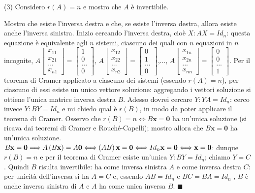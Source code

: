 \documentclass{article}
\begin{document}
(3) Considero $r\left( A\right) =n$ e mostro che $A$ \`{e} invertibile.

Mostro che esiste l'inversa destra e che, se esiste l'inversa destra, allora
esiste anche l'inversa sinistra. Inizio cercando l'inversa destra, cio\`{e} $%
X:AX=Id_{n}$: questa equazione \`{e} equivalente agli $n$ sistemi, ciascuno
dei quali con $n$ equazioni in $n$ incognite, $A\left[ 
\begin{array}{c}
x_{11} \\ 
x_{21} \\ 
... \\ 
x_{n1}%
\end{array}%
\right] =\left[ 
\begin{array}{c}
1 \\ 
0 \\ 
... \\ 
0%
\end{array}%
\right] $, $A\left[ 
\begin{array}{c}
x_{12} \\ 
x_{22} \\ 
... \\ 
x_{n2}%
\end{array}%
\right] =\left[ 
\begin{array}{c}
0 \\ 
1 \\ 
... \\ 
0%
\end{array}%
\right] $,..., $A\left[ 
\begin{array}{c}
x_{1n} \\ 
x_{2n} \\ 
... \\ 
x_{nn}%
\end{array}%
\right] =\left[ 
\begin{array}{c}
0 \\ 
0 \\ 
... \\ 
1%
\end{array}%
\right] $. Per il teorema di Cramer applicato a ciascuno dei sistemi
(essendo $r\left( A\right) =n$), per ciascuno di essi esiste un unico
vettore soluzione: aggregando i vettori soluzione si ottiene l'unica matrice
inversa destra $B$. Adesso dovrei cercare $Y:YA=Id_{n}$: cerco invece $%
Y:BY=Id_{n}$ e mi chiedo qual \`{e} $r\left( B\right) $, in modo da poter
applicare il teorema di Cramer. Osservo
che $r\left( B\right) =n\Longleftrightarrow B\mathbf{x=0}$ ha un'unica
soluzione (si ricava dai teoremi di Cramer e Rouch\'{e}-Capelli); mostro
allora che $B\mathbf{x=0}$ ha un'unica soluzione. $B\mathbf{x=0}%
\Longrightarrow A\left( B\mathbf{x}\right) =A\mathbf{0}\Longleftrightarrow
\left( AB\right) \mathbf{x}=\mathbf{0}\Longleftrightarrow Id_{n}\mathbf{%
x=0\Longleftrightarrow x=0}$: dunque $r\left( B\right) =n$ e per il teorema
di Cramer esiste un'unica $Y:BY=Id_{n}$; chiamo $Y=C$. Quindi $B$ risulta
invertibile: ha come inversa sinistra $A$ e come inversa destra $C$: per
unicit\`{a} dell'inversa si ha $A=C$ e, essendo $AB=Id_{n}$ e $BC=BA=Id_{n}$%
, $B$ \`{e} anche inversa sinistra di $A$ e $A$ ha come unica inversa $B$. $%
\blacksquare $
\end{document}
